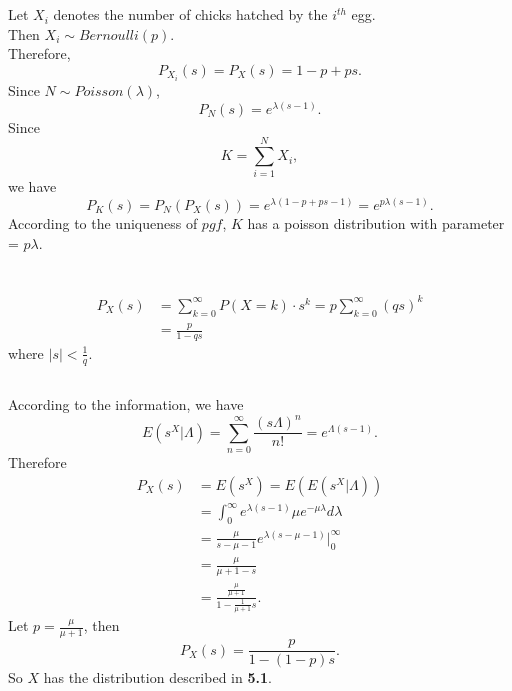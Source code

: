 \documentclass{article}
\begin{document}
\section{}
Let $X_i$ denotes the number of chicks hatched by the $i^{th}$ egg. \\
Then $X_i \sim Bernoulli(p)$. \\
Therefore, 
\begin{equation*}
    P_{X_i}(s) = P_X(s) = 1-p+ps. 
\end{equation*}
Since $N \sim Poisson(\lambda)$,
\begin{equation*}
    P_N(s) = e^{\lambda(s-1)}.
\end{equation*}
Since
\begin{equation*}
    K = \sum\limits_{i = 1}^N X_i,
\end{equation*}
we have
\begin{equation*}
    P_K(s) = P_N(P_X(s)) = e^{\lambda (1 - p + ps - 1)} = e^{p \lambda (s - 1)}. 
\end{equation*}
According to the uniqueness of $pgf$, $K$ has a poisson distribution with parameter = $p \lambda$. 

\section{}
\subsection{}
\begin{align*}
    P_X(s) &= \sum\limits_{k = 0}^\infty P(X = k) \cdot s^k = p \sum\limits_{k = 0}^\infty (qs)^k \\
    &= \frac{p}{1 - qs}
\end{align*}
where $|s| < \frac{1}{q}$.
\subsection{}
According to the information, we have
\begin{equation*}
    E(s^X|\Lambda) = \sum\limits_{n=0}^\infty \frac{(s \Lambda)^n}{n!} = e^{\Lambda (s-1)}.
\end{equation*}
Therefore
\begin{align*}
    P_X(s) &= E(s^X) = E(E(s^X|\Lambda)) \\
    &= \int_0^\infty e^{\lambda (s - 1)} \mu e^{- \mu \lambda} d \lambda \\
    &= \frac{\mu}{s - \mu - 1} e^{\lambda (s - \mu - 1)} \Big|_0^\infty \\
    &= \frac{\mu}{\mu + 1 - s} \\
    &= \frac{\frac{\mu}{\mu + 1}}{1 - \frac{1}{\mu+1} s}.
\end{align*}
Let $p = \frac{\mu}{\mu+1}$, then
\begin{equation*}
    P_X(s) = \frac{p}{1 - (1 - p)s}.
\end{equation*}
So $X$ has the distribution described in \textbf{5.1}. 
\end{document}
